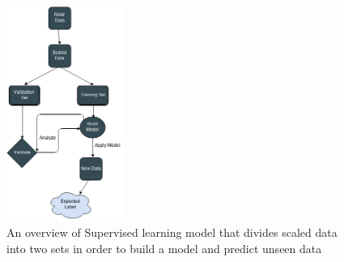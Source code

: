 \begin{figure}[H]
\centering
    \includegraphics[width=38mm,scale=0.3]{./img/SL.png}
    \caption{\footnotesize{An overview of Supervised learning model that divides scaled data into two sets in order to build a model and predict unseen data }}
    \label{fig:SL}
\end{figure}







